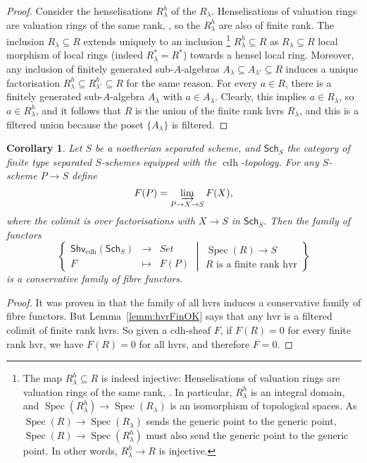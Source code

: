 \documentclass[10pt]{amsart}
\newtheorem{coro}[theo]{Corollary}
\theoremstyle{definition}
\DeclareMathOperator{\Spec}{Spec}
\newcommand{\Shv}{\mathsf{Shv}}
\newcommand{\Sch}{\mathsf{Sch}}
\newcommand{\cdh}{{{\operatorname{cdh}}}}
\begin{document}
\begin{proof}
Consider the henselisations $R_\lambda^h$ of the $R_\lambda$. Henselisations of valuation rings are valuation rings of the same rank, \cite[Tag 0ASK]{Stacks}, so the $R_\lambda^h$ are also of finite rank. The inclusion $R_\lambda \subseteq R$ extends uniquely to an inclusion%
\footnote{The map $R_\lambda^h \subseteq R$ is indeed injective: Henselisations of valuation rings are valuation rings of the same rank, \cite[Tag 0ASK]{Stacks}. In particular, $R_\lambda^h$ is an integral domain, and $\Spec(R_\lambda^h) \to \Spec(R_\lambda)$ is an isomorphism of topological spaces. As $\Spec(R) \to \Spec(R_\lambda)$ sends the generic point to the generic point, $\Spec(R) \to \Spec(R_\lambda^h)$ must also send the generic point to the generic point. In other words, $R_\lambda^h \to R$ is injective.} %
%
$R_\lambda^h \subseteq R$ as $R_\lambda \subseteq R$ local morphism of local rings (indeed $R_\lambda^* = R^*$) towards a hensel local ring. Moreover, any inclusion of finitely generated sub-$A$-algebras $A_\lambda \subseteq A_{\lambda'} \subseteq R$ induces a unique factorisation $R_\lambda^h \subseteq R_{\lambda'}^h \subseteq R$ for the same reason. For every $a \in R$, there is a finitely generated sub-$A$-algebra $A_\lambda$ with $a \in A_\lambda$. Clearly, this implies $a \in R_\lambda$, so $a \in R_\lambda^h$, and it follows that $R$ is the union of the finite rank hvrs $R_\lambda$, and this is a filtered union because the poset $\{A_\lambda\}$ is filtered.
\end{proof}

\begin{coro} \label{coro:finiteRankConservative}
Let $S$ be a noetherian separated scheme, and $\Sch_S$ the category of finite type separated $S$-schemes equipped with the $\cdh$-topology. For any $S$-scheme $P \to S$ define 
\[ F(P) = \varinjlim_{P \to X \to S} F(X), \]
where the colimit is over factorisations with $X \to S$ in $\Sch_S$. Then the family of functors
\[ \left \{ \begin{array}{ccc}
\Shv_\cdh(\Sch_S) &\to& Set \\
F &\mapsto& F(P)
\end{array}
\middle  | \begin{array}{c}
\Spec(R) \to S \\
R \textrm{ is a finite rank hvr} \end{array} \right \} \]
is a conservative family of fibre functors. 
\end{coro}

\begin{proof}
It was proven in \cite[Thm.2.3, Thm.2.6]{GK15} that the family of all hvrs induces a conservative family of fibre functors. But Lemma~\ref{lemm:hvrFinOK} says that any hvr is a filtered colimit of finite rank hvrs. So given a cdh-sheaf $F$, if $F(R) = 0$ for every finite rank hvr, we have $F(R) = 0$ for all hvrs, and therefore $F = 0$.
\end{proof}
\end{document}
